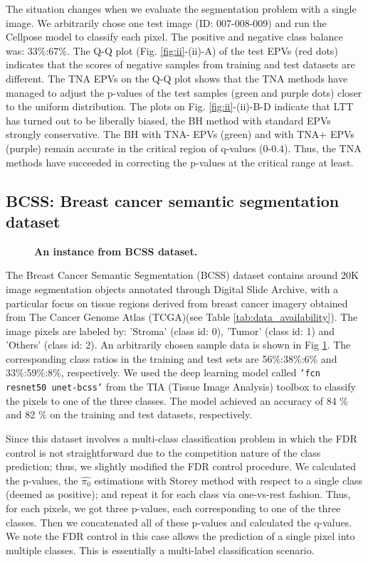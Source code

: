 \documentclass[10pt,letterpaper]{article}
\begin{document}
The situation changes when we evaluate the segmentation problem with a single image.
We arbitrarily chose one test image (ID: 007-008-009) and run the Cellpose model to classify each pixel.
The positive and negative class balance was: 33\%:67\%.
The Q-Q plot (Fig. \ref{fig:ii}-(ii)-A) of the test EPVs (red dots) indicates that the scores of negative samples from training and test datasets are different.
The TNA EPVs on the Q-Q plot shows that the TNA methods have managed to adjust the p-values of the test samples (green and purple dots) closer to the uniform distribution.
The plots on Fig. \ref{fig:ii}-(ii)-B-D indicate that LTT has turned out to be liberally biased, the BH method with standard EPVs strongly conservative.
The BH with TNA- EPVs (green) and with TNA+ EPVs (purple) remain accurate in the critical region of q-values (0-0.4).
Thus, the TNA methods have succeeded in correcting the p-values at the critical range at least. 

\subsection*{BCSS: Breast cancer semantic segmentation dataset}

\begin{figure}[h!]
	\centering
	\caption{{\bf An instance from BCSS dataset.}}
	\label{fig:bcss_example}
\end{figure} 

The Breast Cancer Semantic Segmentation (BCSS) dataset \cite{Amgad2019StructuredCE} contains around 20K image segmentation objects annotated through Digital Slide Archive, with a particular focus on tissue regions derived from breast cancer imagery obtained from The Cancer Genome Atlas (TCGA)(see Table \ref{tab:data_availability}).
The image pixels are labeled by: 'Stroma' (class id: 0), 'Tumor' (class id: 1) and 'Others' (class id: 2).
An arbitrarily chosen sample data is shown in Fig \ref{fig:bcss_example}.
The corresponding class ratios in the training and test sets are 56\%:38\%:6\% and 33\%:59\%:8\%, respectively.
We used the deep learning model called \texttt{'fcn resnet50 unet-bcss'} from the TIA (Tissue Image Analysis) toolbox \cite{Pocock2022} to classify the pixels to one of the three classes.
The model achieved an accuracy of 84 \% and 82 \% on the training and test datasets, respectively. 


Since this dataset involves a multi-class classification problem in which the FDR control is not straightforward due to the competition nature of the class prediction; thus,  we slightly modified the FDR control procedure.
We calculated the p-values, the $\hat{\pi_0}$ estimations with Storey method with respect to a single class (deemed as positive); and repeat it for each class via one-vs-rest fashion.
Thus, for each pixels, we got three p-values, each corresponding to one of the three classes.
Then we concatenated all of these p-values and calculated the q-values.
We note the FDR control in this case allows the prediction of a single pixel into multiple classes.
This is essentially a multi-label classification scenario. 
\end{document}
